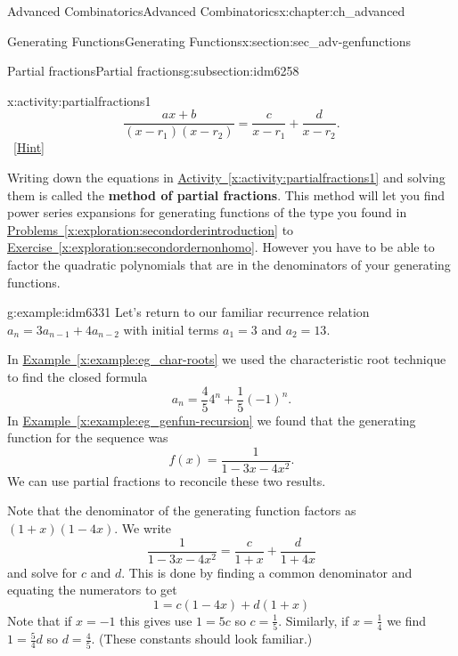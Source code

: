 \documentclass[oneside,10pt,]{book}
\newcommand{\terminology}[1]{\textbf{#1}}
\numberwithin{equation}{chapter}
\begin{document}
\begin{chapterptx}{Advanced Combinatorics}{}{Advanced Combinatorics}{}{}{x:chapter:ch_advanced}
\begin{sectionptx}{Generating Functions}{}{Generating Functions}{}{}{x:section:sec_adv-genfunctions}
\begin{subsectionptx}{Partial fractions}{}{Partial fractions}{}{}{g:subsection:idm6258}
\begin{activity}{}{x:activity:partialfractions1}
\begin{equation*}
\frac{ax+b}{(x-r_1)(x-r_2)} = \frac{c}{x-r_1} + \frac{d}{x-r_2}\text{.}
\end{equation*}
%
\qquad~\hfill{\tiny\hyperlink{g:hint:idm6310-back}{[Hint]}}\end{activity}
Writing down the equations in \hyperref[x:activity:partialfractions1]{Activity~\ref{x:activity:partialfractions1}} and solving them is called the \terminology{method of partial fractions}. This method will let you find power series expansions for generating functions of the type you found in \hyperref[x:exploration:secondorderintroduction]{Problems~\ref{x:exploration:secondorderintroduction}} to \hyperref[x:exploration:secondordernonhomo]{Exercise~\ref{x:exploration:secondordernonhomo}}. However you have to be able to factor the quadratic polynomials that are in the denominators of your generating functions.%
\begin{example}{}{g:example:idm6331}%
Let's return to our familiar recurrence relation \(a_n = 3a_{n-1} + 4a_{n-2}\) with initial terms \(a_1 = 3\) and \(a_2 = 13\).%
\par
In \hyperref[x:example:eg_char-roots]{Example~\ref{x:example:eg_char-roots}} we used the characteristic root technique to find the closed formula%
\begin{equation*}
a_n = \frac{4}{5} 4^n + \frac{1}{5} (-1)^n \text{.}
\end{equation*}
In \hyperref[x:example:eg_genfun-recursion]{Example~\ref{x:example:eg_genfun-recursion}} we found that the generating function for the sequence was%
\begin{equation*}
f(x) = \frac{1}{1-3x - 4x^2}\text{.}
\end{equation*}
We can use partial fractions to reconcile these two results.%
\par
Note that the denominator of the generating function factors as \((1+x)(1-4x)\).  We write%
\begin{equation*}
\frac{1}{1-3x-4x^2} = \frac{c}{1+x}+\frac{d}{1+4x}
\end{equation*}
and solve for \(c\) and \(d\).  This is done by finding a common denominator and equating the numerators to get%
\begin{equation*}
1 = c(1-4x) + d(1+x)
\end{equation*}
Note that if \(x = -1\) this gives use \(1 = 5c\) so \(c = \frac{1}{5}\).  Similarly, if \(x = \frac{1}{4}\) we find \(1 = \frac{5}{4}d\) so \(d = \frac{4}{5}\).  (These constants should look familiar.)%

\end{example}
\end{subsectionptx}
\end{sectionptx}
\end{chapterptx}
\end{document}
